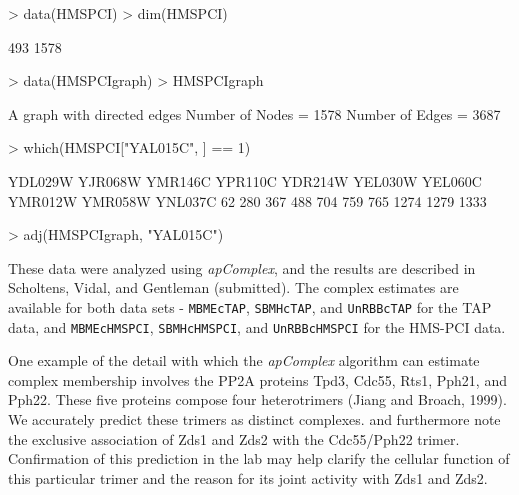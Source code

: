 \documentclass[11pt]{article}
\newcommand{\Robject}[1]{{\texttt{#1}}}
\newcommand{\Rpackage}[1]{{\textit{#1}}}
\begin{document}
\begin{Schunk}
\begin{Sinput}
> data(HMSPCI)
> dim(HMSPCI)
\end{Sinput}
\begin{Soutput}
[1]  493 1578
\end{Soutput}
\begin{Sinput}
> data(HMSPCIgraph)
> HMSPCIgraph
\end{Sinput}
\begin{Soutput}
A graph with  directed  edges
Number of Nodes = 1578
Number of Edges = 3687
\end{Soutput}
\begin{Sinput}
> which(HMSPCI["YAL015C", ] == 1)
\end{Sinput}
\begin{Soutput}
YDL029W YJR068W YMR146C YPR110C YDR214W YEL030W YEL060C YMR012W YMR058W YNL037C 
     62     280     367     488     704     759     765    1274    1279    1333 
\end{Soutput}
\begin{Sinput}
> adj(HMSPCIgraph, "YAL015C")
\end{Sinput}
\end{Schunk}

These data were analyzed using \Rpackage{apComplex}, and the results are
described in Scholtens, Vidal, and Gentleman
(submitted).  The complex estimates are available for both data sets -
\Robject{MBMEcTAP}, \Robject{SBMHcTAP}, and \Robject{UnRBBcTAP} for the TAP
data, and \Robject{MBMEcHMSPCI}, \Robject{SBMHcHMSPCI}, and
\Robject{UnRBBcHMSPCI} for the HMS-PCI data.  

One example of the detail with which the \Rpackage{apComplex} algorithm can
estimate complex membership involves the PP2A proteins Tpd3, Cdc55, Rts1,
Pph21, and Pph22.  These five proteins compose four heterotrimers (Jiang and
Broach, 1999).  We
accurately predict these trimers as distinct complexes. and furthermore note
the exclusive association of Zds1 and Zds2 with the Cdc55/Pph22 trimer.
Confirmation of this prediction in the lab may help clarify the cellular
function of this particular trimer and the reason for its joint activity with
Zds1 and Zds2.
\end{document}
